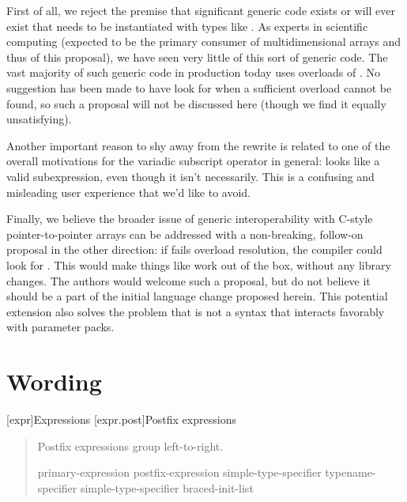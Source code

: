 \documentclass{wg21}
\begin{document}
First of all, we reject the premise that significant generic code exists or will ever exist that needs to be instantiated with types like . As experts in scientific computing (expected to be the primary consumer of multidimensional arrays and thus of this proposal), we have seen very little of this sort of generic code. The vast majority of such generic code in production today uses overloads of . No suggestion has been made to have  look for  when a sufficient  overload cannot be found, so such a proposal will not be discussed here (though we find it equally unsatisfying).

Another important reason to shy away from the  rewrite is related to one of the overall motivations for the variadic subscript operator in general:  looks like a valid subexpression, even though it isn't necessarily.  This is a confusing and misleading user experience that we'd like to avoid. 

Finally, we believe the broader issue of generic interoperability with C-style pointer-to-pointer arrays can be addressed with a non-breaking, follow-on proposal in the other direction: if  fails overload resolution, the compiler could look for . This would make things like  work out of the box, without any library changes. The authors would welcome such a proposal, but do not believe it should be a part of the initial language change proposed herein. This potential extension also solves the problem that  is not a syntax that interacts favorably with parameter packs.

\section{Wording}

[expr]{Expressions}
[expr.post]{Postfix expressions}%

\begin{quote}
\pnum
Postfix expressions group left-to-right.

\begin{bnf}
primary-expression
postfix-expression \terminal{(}  \terminal{)}
simple-type-specifier \terminal{(}  \terminal{)}
typename-specifier \terminal{(}  \terminal{)}
simple-type-specifier braced-init-list
\end{bnf}
\end{quote}
\end{document}
